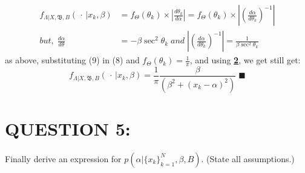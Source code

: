 \documentclass[a4paper,11pt]{article}
\begin{document}
\begin{align}
	f_{\Lambda | X, \mathfrak{B},B} (\, \cdot \, | x_k, \beta) &= f_\Theta (\theta_k) \times \left| \frac{d\theta_k}{d\alpha} \right| = f_\Theta (\theta_k) \times \left| \left(\frac{d\alpha}{d\theta_k} \right)^{-1} \right| \\
	but, \; \frac{d\alpha}{d\theta} &= -\beta \sec^2 \theta_k \; and \; \left| \left(\frac{d\alpha}{d\theta_k} \right)^{-1} \right| = \frac{1}{\beta \sec^2 \theta_k}
\end{align}
as above, substituting (9) in (8) and $f_\Theta (\theta_k) = \frac{1}{\pi}$, and using \hyperref[sec:proof]{\textbf{2}}, we get still get:
\begin{equation}
	f_{\Lambda | X, \mathfrak{B},B} (\, \cdot \, | x_k, \beta) = \frac{1}{\pi} \frac{\beta}{(\beta^2 + (x_k - \alpha)^2)} \; \blacksquare
\end{equation}

\section{QUESTION 5:}
Finally derive an expression for $p(\alpha | \{x_k\}^N _{k = 1}, \beta, B)$. (State all assumptions.)
\end{document}
